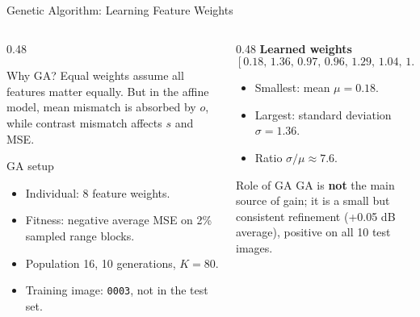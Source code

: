 \documentclass[10pt,aspectratio=169]{beamer}
\begin{document}
\begin{frame}{Genetic Algorithm: Learning Feature Weights}
  \begin{columns}[T,onlytextwidth]
    \begin{column}{0.48\textwidth}
      \begin{block}{Why GA?}
        Equal weights assume all features matter equally. But in the affine model,
        mean mismatch is absorbed by $o$, while contrast mismatch affects $s$ and MSE.
      \end{block}
      \begin{exampleblock}{GA setup}
        \begin{itemize}
          \item Individual: 8 feature weights.
          \item Fitness: negative average MSE on 2\% sampled range blocks.
          \item Population 16, 10 generations, $K=80$.
          \item Training image: \texttt{0003}, not in the test set.
        \end{itemize}
      \end{exampleblock}
    \end{column}
    \hfill
    \begin{column}{0.48\textwidth}
      \textbf{Learned weights}
      \[
        [0.18,\,1.36,\,0.97,\,0.96,\,1.29,\,1.04,\,1.00,\,0.75]
      \]
      \begin{itemize}
        \item Smallest: mean $\mu=0.18$.
        \item Largest: standard deviation $\sigma=1.36$.
        \item Ratio $\sigma/\mu\approx7.6$.
      \end{itemize}
      \begin{alertblock}{Role of GA}
        GA is \textbf{not} the main source of gain; it is a small but consistent refinement
        (+0.05 dB average), positive on all 10 test images.
      \end{alertblock}
    \end{column}
  \end{columns}
\end{frame}
\end{document}
